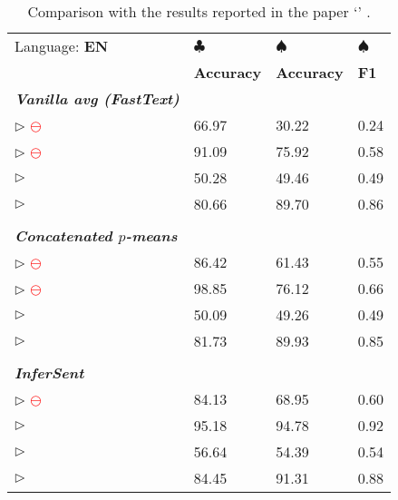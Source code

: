\begin{table}[h]
	\centering
	\renewcommand{\arraystretch}{1.1}
	\begin{tabularx}{\textwidth}{| X Y | Y Y |}
		\hline
		Language: \textbf{EN}										&
		\textbf{$\clubsuit$} 											&
		\textbf{$\spadesuit$}					 						&
		\textbf{$\spadesuit$}											\\
					 												&
		\textbf{Accuracy} 											&
		\textbf{Accuracy} 											&
		\textbf{F1} 													\\
		\textbf{\textit{Vanilla avg (FastText)}} & & &					\\
		\hline
		$\triangleright$  \textcolor{red}{$\ominus$}
								&	66.97	&	30.22	&	0.24 	\\
		$\triangleright$  \textcolor{red}{$\ominus$}
								&	91.09	&	75.92	&	0.58 	\\
		$\triangleright$ 	
								&	50.28	&	49.46	&	0.49 	\\
		$\triangleright$  	
								&	80.66	&	89.70	&	0.86 	\\
		& & & 														\\
		\textbf{\textit{Concatenated $p$-means}} & & &					\\
		\hline
		$\triangleright$  \textcolor{red}{$\ominus$}
								&	86.42	&	61.43	&	0.55 	\\
		$\triangleright$  \textcolor{red}{$\ominus$}
								& 	98.85	&	76.12	&	0.66 	\\
		$\triangleright$ 	
								&	50.09	&	49.26	&	0.49 	\\
		$\triangleright$ 	
								&	81.73	&	89.93	&	0.85 	\\
		& & & 														\\
		\textbf{\textit{InferSent}} & & &		 						\\
		\hline
		$\triangleright$  \textcolor{red}{$\ominus$}
								&	84.13	&	68.95	&	0.60 	\\
		$\triangleright$ 
								&	95.18	&	94.78	&	0.92	\\
		$\triangleright$ 	
								&	56.64	&	54.39	&	0.54 	\\
		$\triangleright$ 	
								&	84.45	&	91.31	&	0.88 	\\
		\hline
	\end{tabularx}
	\caption[Comparison with the results of Perone et al.]
		{Comparison with the results reported in the paper `' \citep{Perone.2018}.}
	\label{tab:comparison_perone}
\end{table}
